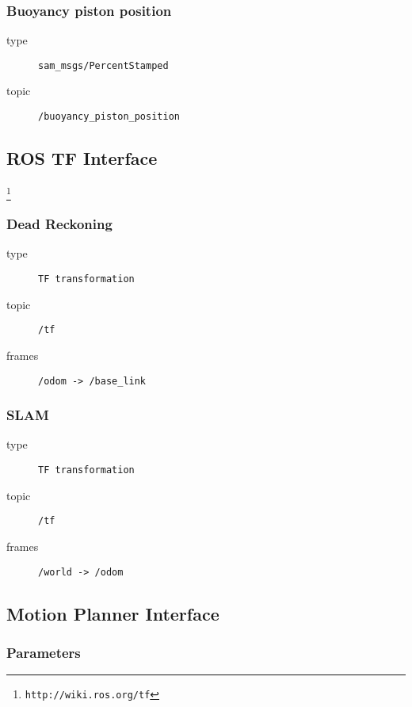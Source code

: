 \documentclass[9pt,technote]{IEEEtran} %
\begin{document}
\subsubsection{Buoyancy piston position}

\begin{description}
\item[type] \texttt{sam\_msgs/PercentStamped}
\item[topic] \texttt{/buoyancy\_piston\_position}
\end{description}

\subsection{ROS TF Interface}

\footnote{\texttt{http://wiki.ros.org/tf}} 

\subsubsection{Dead Reckoning}

\begin{description}
\item[type] \texttt{TF transformation}
\item[topic] \texttt{/tf}
\item[frames] \texttt{/odom -> /base\_link}
\end{description}

\subsubsection{SLAM}

\begin{description}
\item[type] \texttt{TF transformation}
\item[topic] \texttt{/tf}
\item[frames] \texttt{/world -> /odom}
\end{description}

\subsection{Motion Planner Interface}

\subsubsection{Parameters}
\end{document}

